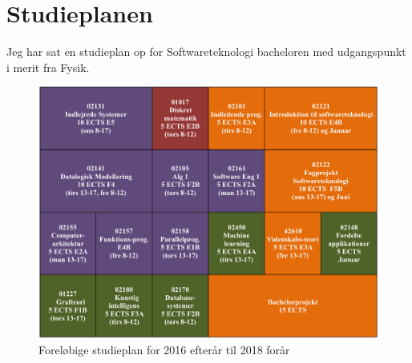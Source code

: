 \section{Studieplanen}

Jeg har sat en studieplan op for Softwareteknologi bacheloren med udgangspunkt i merit fra Fysik.

\begin{figure}[H]
    \centering
    \includegraphics[width=\textwidth]{SelveStudieplanen/studieplan.pdf}
    \caption{Foreløbige studieplan for 2016 efterår til 2018 forår}
    \label{fig:my_label}
\end{figure}

